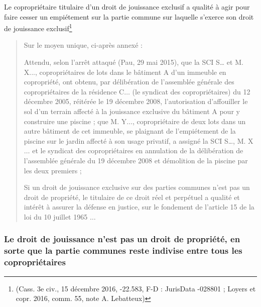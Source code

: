 			Le copropriétaire titulaire d’un droit de jouissance exclusif a qualité à agir pour faire cesser un
			empiétement sur la partie commune sur laquelle s’exerce son droit de jouissance exclusif\footnote{(Cass. 3e civ., 15 décembre 2016, -22.583, F-D : JurisData -028801 ; Loyers et copr.
			2016, comm. 55, note A. Lebatteux)}
			\begin{quote}
				Sur le moyen unique, ci-après annexé :
			
				Attendu, selon l'arrêt attaqué (Pau, 29 mai 2015), que la SCI S… et M. X..., copropriétaires de lots
				dans le bâtiment A d'un immeuble en copropriété, ont obtenu, par délibération de l'assemblée
				générale des copropriétaires de la résidence C$\dots$ (le syndicat des copropriétaires) du 12 décembre
				2005, réitérée le 19 décembre 2008, l'autorisation d'affouiller le sol d'un terrain affecté à la
				jouissance exclusive du bâtiment A pour y construire une piscine ; que M. Y$\dots$, copropriétaire de deux
				lots dans un autre bâtiment de cet immeuble, se plaignant de l'empiétement de la piscine sur le
				jardin affecté à son usage privatif, a assigné la SCI S…, M. X$\dots$ et le syndicat des copropriétaires en
				annulation de la délibération de l'assemblée générale du 19 décembre 2008 et démolition de la
				piscine par les deux premiers ;
				
				Si un droit de jouissance exclusive sur des parties communes n'est pas un droit de propriété, le
				titulaire de ce droit réel et perpétuel a qualité et intérêt à assurer la défense en justice, sur le
				fondement de l'article 15 de la loi du 10 juillet 1965 $\dots$
			\end{quote}
		
		\subsubsection{Le droit de jouissance n’est pas un droit de propriété, en sorte que la partie communes	reste indivise entre tous les copropriétaires}
		
